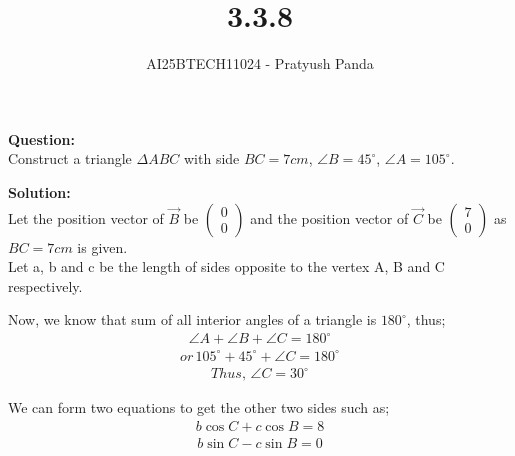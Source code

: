 \documentclass{beamer}
\title{3.3.8}
\author{AI25BTECH11024 - Pratyush Panda}
\theoremstyle{remark}
\newcommand{\myvec}[1]{\ensuremath{\begin{pmatrix}#1\end{pmatrix}}}
\numberwithin{equation}{section}
\begin{document}
\maketitle

\begin{frame}
\textbf{Question: } \\
Construct a triangle $\Delta ABC$ with side $BC = 7 cm$, $\angle B=45^\circ$, $\angle A=105^\circ$.
\end{frame}

\begin{frame}
\textbf{Solution: } \\
Let the position vector of $\Vec{B}$ be $\myvec{0 \\ 0}$ and the position vector of $\Vec{C}$ be $\myvec{7 \\ 0}$ as $BC=7cm$ is given.\\
Let a, b and c be the length of sides opposite to the vertex A, B and C respectively.

Now, we know that sum of all interior angles of a triangle is $180^\circ$, thus;
\begin{align}
\angle A + \angle B + \angle C = 180^\circ
\end{align}
\begin{align}
or \, 105^\circ + 45^\circ + \angle C = 180^\circ
\end{align}
\begin{align}
Thus, \, \angle C = 30^\circ
\end{align}

We can form two equations to get the other two sides such as;
\begin{align}
b\cos C + c\cos B = 8
\end{align}
\begin{align}
b\sin C - c\sin B = 0
\end{align}
\end{frame}
\end{document}
